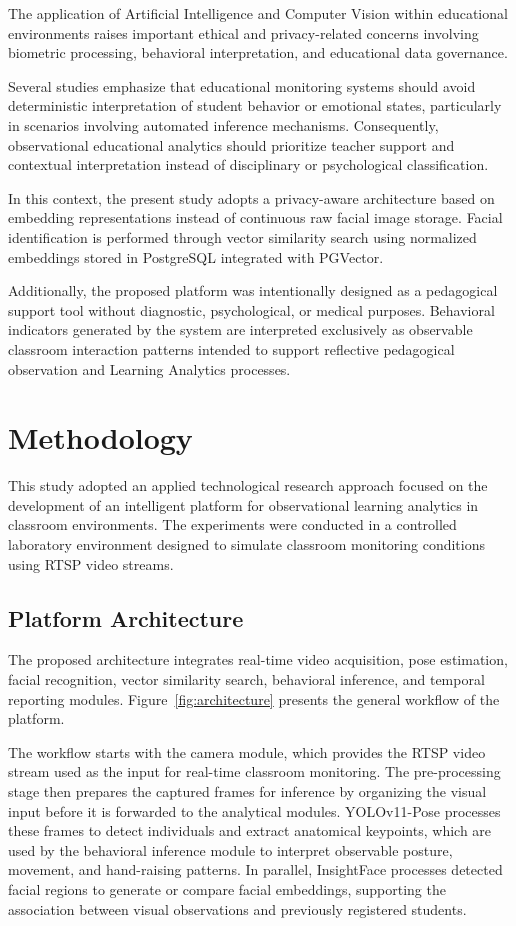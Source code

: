 \documentclass[12pt,a4paper]{article}
\begin{document}
The application of Artificial Intelligence and Computer Vision within educational environments raises important ethical and privacy-related concerns involving biometric processing, behavioral interpretation, and educational data governance.

Several studies emphasize that educational monitoring systems should avoid deterministic interpretation of student behavior or emotional states, particularly in scenarios involving automated inference mechanisms. Consequently, observational educational analytics should prioritize teacher support and contextual interpretation instead of disciplinary or psychological classification.

In this context, the present study adopts a privacy-aware architecture based on embedding representations instead of continuous raw facial image storage. Facial identification is performed through vector similarity search using normalized embeddings stored in PostgreSQL integrated with PGVector.

Additionally, the proposed platform was intentionally designed as a pedagogical support tool without diagnostic, psychological, or medical purposes. Behavioral indicators generated by the system are interpreted exclusively as observable classroom interaction patterns intended to support reflective pedagogical observation and Learning Analytics processes.


\section{Methodology}

This study adopted an applied technological research approach focused on the development of an intelligent platform for observational learning analytics in classroom environments. The experiments were conducted in a controlled laboratory environment designed to simulate classroom monitoring conditions using RTSP video streams.

\subsection{Platform Architecture}
The proposed architecture integrates real-time video acquisition, pose estimation, facial recognition, vector similarity search, behavioral inference, and temporal reporting modules. Figure~\ref{fig:architecture} presents the general workflow of the platform.

The workflow starts with the camera module, which provides the RTSP video stream used as the input for real-time classroom monitoring. The pre-processing stage then prepares the captured frames for inference by organizing the visual input before it is forwarded to the analytical modules. YOLOv11-Pose processes these frames to detect individuals and extract anatomical keypoints, which are used by the behavioral inference module to interpret observable posture, movement, and hand-raising patterns. In parallel, InsightFace processes detected facial regions to generate or compare facial embeddings, supporting the association between visual observations and previously registered students.
\end{document}
